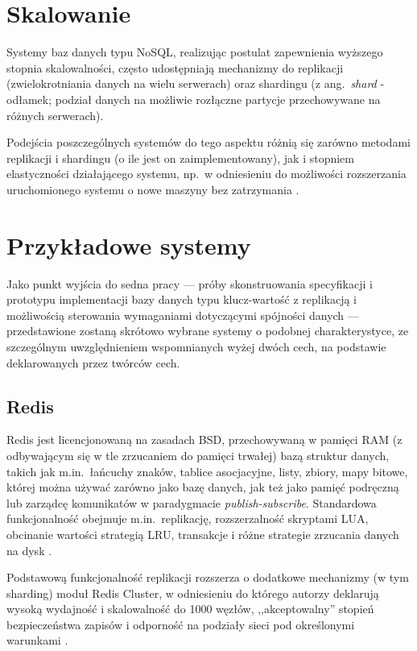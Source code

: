 \section{Skalowanie}

Systemy baz danych typu NoSQL, realizując postulat zapewnienia wyższego stopnia skalowalności,
często udostępniają mechanizmy do replikacji (zwielokrotniania danych na wielu serwerach) oraz
shardingu (z ang.\ \textit{shard} - odłamek; podział danych na możliwie rozłączne partycje przechowywane na różnych serwerach).

Podejścia poszczególnych systemów do tego aspektu różnią się zarówno metodami replikacji i shardingu
(o ile jest on zaimplementowany), jak i stopniem elastyczności działającego systemu, np.\ w odniesieniu do możliwości rozszerzania uruchomionego systemu o nowe maszyny bez zatrzymania \cite{ell09a}.

\section{Przykładowe systemy}

Jako punkt wyjścia do sedna pracy --- próby skonstruowania specyfikacji i prototypu implementacji bazy danych typu klucz-wartość z replikacją i możliwością sterowania wymaganiami dotyczącymi spójności danych --- przedstawione zostaną skrótowo wybrane systemy o podobnej charakterystyce, ze szczególnym uwzględnieniem wspomnianych wyżej dwóch cech, na podstawie deklarowanych przez twórców cech.

\subsection{Redis}

Redis jest licencjonowaną na zasadach BSD, przechowywaną w pamięci RAM (z odbywającym się w tle
zrzucaniem do pamięci trwałej) bazą struktur danych, takich jak m.in.\ łańcuchy znaków, tablice
asocjacyjne, listy, zbiory, mapy bitowe, której można używać zarówno jako bazę danych, jak też jako
pamięć podręczną lub zarządcę komunikatów w paradygmacie \textit{publish-subscribe}. Standardowa
funkcjonalność obejmuje m.in.\ replikację, rozszerzalność skryptami LUA, obcinanie wartości strategią LRU, transakcje i różne strategie zrzucania danych na dysk \cite{redis}.

Podstawową funkcjonalność replikacji rozszerza o dodatkowe mechanizmy (w tym sharding) moduł Redis Cluster, w odniesieniu do którego autorzy deklarują wysoką wydajność i skalowalność do 1000 węzłów, ,,akceptowalny'' stopień bezpieczeństwa zapisów i odporność na podziały sieci pod określonymi warunkami \cite{rediscluster}.

